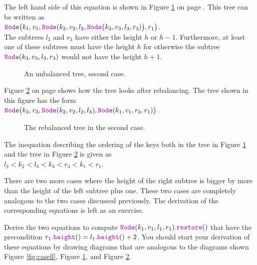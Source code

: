\begin{enumerate}
       The left hand side of this equation is shown in Figure  \ref{fig:caselr} on page
       \pageref{fig:caselr}.  This tree can be written as
       \\[0.2cm]
       \hspace*{1.3cm} 
       $\mytt{Node}\bigl(k_1,v_1,\mytt{Node}(k_2,v_2,l_2,\mytt{Node}\bigl(k_3,v_3,l_3,r_3)\bigr),r_1\bigr)$. 
       \\[0.2cm]
       The subtrees $l_3$ and $r_3$ have either the height  $h$ or $h-1$.  Furthermore, at least one
       of these subtrees must have the height  $h$ for otherwise the subtree
       $\mytt{Node}(k_3,v_3,l_3,r_3)$ would not have the height $h+1$.
       
\begin{figure}[!ht]
  \centering
  \caption{An unbalanced tree, second case.}
  \label{fig:caselr}
\end{figure}

     Figure \ref{fig:caselr-nach} on page \pageref{fig:caselr-nach} shows how the tree looks after
     rebalancing.  The tree shown in this figure has the form
     \\[0.2cm]
     \hspace*{1.3cm} 
     $\mytt{Node}\bigl(k_3,v_3,\mytt{Node}(k_2,v_2,l_2,l_3),\mytt{Node}(k_1,v_1,r_3,r_1) \bigr)$.


\begin{figure}[!ht]
  \centering
  \caption{The rebalanced tree in the second case.}
  \label{fig:caselr-nach}
\end{figure}

      The inequation describing the ordering of the keys both in the tree in Figure \ref{fig:caselr} and the
      tree in Figure \ref{fig:caselr-nach} is given as
      \\[0.2cm]
      \hspace*{1.3cm} $l_2 < k_2 < l_3 < k_3 < r_3 < k_1 < r_1$.

      There are two more cases where the height of the right subtree is bigger by more than 
      the height of the left subtree plus one.  These two cases are completely analogous to the two
      cases discussed previously.  The derivation of the corresponding equations is left as an exercise.
\end{enumerate}

\exercise
Derive the two equations to compute $\mytt{Node}(k_1,v_1,l_1,r_1).\mytt{restore}()$ that have the
precondition $r_1.\mytt{height}() = l_1.\mytt{height}() + 2$.  You should start your derivation of these
equations by drawing diagrams that are analogous to the diagrams shown Figure \ref{fig:casell}, Figure
\ref{fig:caselr}, and Figure \ref{fig:caselr-nach}. 
\eox

